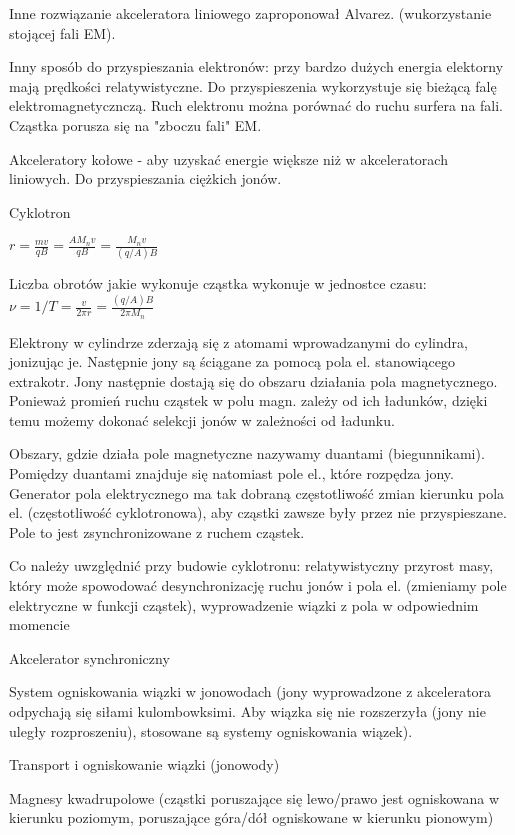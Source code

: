 \documentclass{article}
\begin{document}
Inne rozwiązanie akceleratora liniowego zaproponował Alvarez. (wukorzystanie stojącej fali EM).

Inny sposób do przyspieszania elektronów: przy bardzo dużych energia elektorny mają prędkości relatywistyczne. Do przyspieszenia wykorzystuje się bieżącą falę elektromagnetycznczą. Ruch elektronu można porównać do ruchu surfera na fali. Cząstka porusza się na "zboczu fali" EM.

Akceleratory kołowe - aby uzyskać energie większe niż w akceleratorach liniowych. Do przyspieszania ciężkich jonów.

Cyklotron

$r = \frac{mv}{qB} = \frac{AM_nv}{qB} = \frac{M_nv}{(q/A)B}$

Liczba obrotów jakie wykonuje cząstka wykonuje w jednostce czasu: $\nu  = 1/T = \frac{v}{2\pi r} = \frac{(q/A)B}{2\pi M_n}$

Elektrony w cylindrze zderzają się z atomami wprowadzanymi do cylindra, jonizując je. Następnie jony są ściągane za pomocą pola el. stanowiącego extrakotr. Jony następnie dostają się do obszaru działania pola magnetycznego. Ponieważ promień ruchu cząstek w polu magn. zależy od ich ładunków, dzięki temu możemy dokonać selekcji jonów w zależności od ładunku.

Obszary, gdzie działa pole magnetyczne nazywamy duantami (biegunnikami). Pomiędzy duantami znajduje się natomiast pole el., które rozpędza jony. Generator pola elektrycznego ma tak dobraną częstotliwość zmian kierunku pola el. (częstotliwość cyklotronowa), aby cząstki zawsze były przez nie przyspieszane. Pole to jest zsynchronizowane z ruchem cząstek.

Co należy uwzględnić przy budowie cyklotronu: relatywistyczny przyrost masy, który może spowodować desynchronizację ruchu jonów i pola el. (zmieniamy pole elektryczne w funkcji cząstek), wyprowadzenie wiązki z pola w odpowiednim momencie

Akcelerator synchroniczny

System ogniskowania wiązki w jonowodach (jony wyprowadzone z akceleratora odpychają się siłami kulombowksimi. Aby wiązka się nie rozszerzyła (jony nie uległy rozproszeniu), stosowane są systemy ogniskowania wiązek).

Transport i ogniskowanie wiązki (jonowody)

Magnesy kwadrupolowe (cząstki poruszające się lewo\slash prawo jest ogniskowana w kierunku poziomym, poruszające góra\slash dół ogniskowane w kierunku pionowym)
\end{document}
